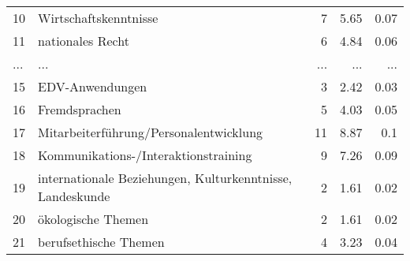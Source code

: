 \begin{longtable}{lXrrr}
        10 & \multicolumn{1}{X}{Wirtschaftskenntnisse} & %
          \num{7} &
          \num[round-mode=places,round-precision=2]{5,65} &
          \num[round-mode=places,round-precision=2]{0,07} \\
        11 & \multicolumn{1}{X}{nationales Recht} & %
          \num{6} &
          \num[round-mode=places,round-precision=2]{4,84} &
          \num[round-mode=places,round-precision=2]{0,06} \\
       ... & ... & ... & ... & ... \\
        15 & \multicolumn{1}{X}{EDV-Anwendungen} & %
          \num{3} &
          \num[round-mode=places,round-precision=2]{2,42} &
          \num[round-mode=places,round-precision=2]{0,03} \\

        16 & \multicolumn{1}{X}{Fremdsprachen} & %
          \num{5} &
          \num[round-mode=places,round-precision=2]{4,03} &
          \num[round-mode=places,round-precision=2]{0,05} \\

        17 & \multicolumn{1}{X}{Mitarbeiterführung/Personalentwicklung} & %
          \num{11} &
          \num[round-mode=places,round-precision=2]{8,87} &
          \num[round-mode=places,round-precision=2]{0,1} \\

        18 & \multicolumn{1}{X}{Kommunikations-/Interaktionstraining} & %
          \num{9} &
          \num[round-mode=places,round-precision=2]{7,26} &
          \num[round-mode=places,round-precision=2]{0,09} \\

        19 & \multicolumn{1}{X}{internationale Beziehungen, Kulturkenntnisse, Landeskunde} & %
          \num{2} &
          \num[round-mode=places,round-precision=2]{1,61} &
          \num[round-mode=places,round-precision=2]{0,02} \\

        20 & \multicolumn{1}{X}{ökologische Themen} & %
          \num{2} &
          \num[round-mode=places,round-precision=2]{1,61} &
          \num[round-mode=places,round-precision=2]{0,02} \\

        21 & \multicolumn{1}{X}{berufsethische Themen} & %
          \num{4} &
          \num[round-mode=places,round-precision=2]{3,23} &
          \num[round-mode=places,round-precision=2]{0,04} \\


\end{longtable}
